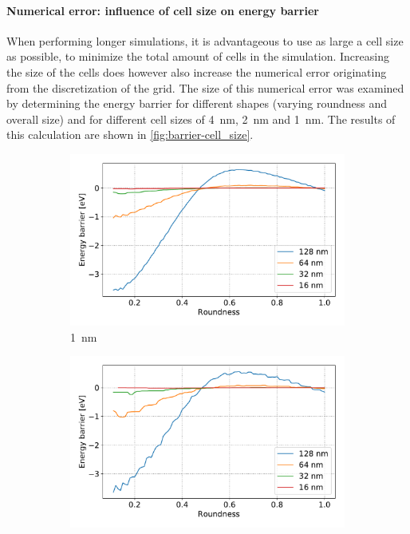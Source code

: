 \documentclass[10pt,a4paper]{article}
\begin{document}
\paragraph{Numerical error: influence of cell size on energy barrier}
When performing longer simulations, it is advantageous to use as large a cell size as possible, to minimize the total amount of cells in the simulation. Increasing the size of the cells does however also increase the numerical error originating from the discretization of the grid. The size of this numerical error was examined by determining the energy barrier for different shapes (varying roundness and overall size) and for different cell sizes of \SI{4}{\nano\metre}, \SI{2}{\nano\metre} and \SI{1}{\nano\metre}. The results of this calculation are shown in \cref{fig:barrier-cell_size}.
\begin{figure}
     \centering
     \begin{subfigure}[b]{0.75\textwidth}
         \centering
         \includegraphics[width=\textwidth]{Figures/biaxial_island/Barrier/Plus_16-128_0.1-1_aPi4_B0.001_cell1nm.pdf}
         \caption{\SI{1}{\nano\metre}}
         \label{fig:barrier-cell_size-1nm}
     \end{subfigure}
     \hfill
     \begin{subfigure}[b]{0.75\textwidth}
         \centering
         \includegraphics[width=\textwidth]{Figures/biaxial_island/Barrier/Plus_16-128_0.1-1_aPi4_B0.001_cell2nm.pdf}

\end{subfigure}
\end{figure}
\end{document}
